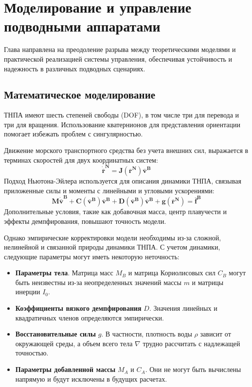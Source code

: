 \chapter{Моделирование и управление подводными аппаратами}
\label{chap:mat}


    Глава направлена на преодоление разрыва между теоретическими моделями и практической реализацией системы управления, обеспечивая устойчивость и надежность в различных подводных сценариях.

\section{Математическое моделирование}

    ТНПА имеют шесть степеней свободы (DOF), в том числе три для перевода и три для вращения. Использование кватернионов для представления ориентации помогает избежать проблем с сингулярностью.

    Движение морского транспортного средства без учета внешних сил, 
    выражается в терминах скоростей для двух координатных систем:
    \begin{equation*}
        \mathbf{\dot{\bar{r}}^N=J(\bar{r}^N) \bar{v}^B}
    \end{equation*}
    Подход Ньютона-Эйлера используется для описания динамики ТНПА, связывая приложенные силы и моменты с линейными и угловыми ускорениями:
    \begin{equation*}
        \mathbf{M \dot{\bar{v}}^B + C(\bar{v}^B) \bar{v}^B+D(\bar{v}^B) 
    \bar{v}^B+g(\bar{r}^N)= \bar{f}^B}
    \end{equation*}
    Дополнительные условия, такие как добавочная масса, центр плавучести и эффекты демпфирования, повышают точность модели.

    Однако эмпирические корректировки модели необходимы из-за сложной, нелинейной и связанной природы динамики ТНПА.
    С учетом динамики, следующие параметры могут иметь некоторую неточность:
    \begin{itemize}
        \item \textbf{Параметры тела}. Матрица масс $M_B$ и матрица Кориолисовых сил $C_B$ могут быть неизвестны из-за неопределенных значений массы $m$ и матрицы инерции $I_0$.
        \item \textbf{Коэффициенты вязкого демпфирования} $D$. Значения линейных и квадратичных членов определяются эмпирически.
        \item \textbf{Восстановительные силы} $g$. В частности, плотность воды $\rho$ зависит от окружающей среды, а объем всего тела $\nabla$ трудно рассчитать с надлежащей точностью.
        \item \textbf{Параметры добавленной массы} $M_A$ и $C_A$. Они не могут быть вычислены напрямую и будут исключены в будущих расчетах.
    \end{itemize}
    
